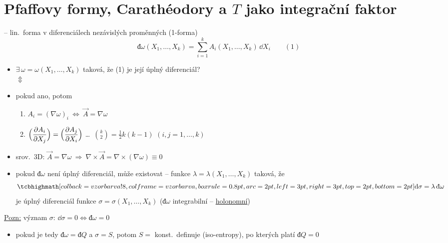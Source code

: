 \section{Pfaffovy formy, Carathéodory a $T$ jako integrační faktor}
\providecommand{\dbar}{\text{đ}}
\providecommand{\xcancel}[1]{\text{\tikz[baseline=(X.base)]{\node[inner sep=0pt] (X) {$\displaystyle #1$}; \draw[NavyBlue] (X.south west) -- (X.north east);}}}

\begin{definice}
 -- lin.\ forma v diferenciálech nezávislých proměnných (1-forma)
\[
  \dbar\omega(X_1,\dots,X_k) = \sum_{i=1}^k A_i(X_1,\dots,X_k)\,\dd X_i \qquad (1)
\]
\end{definice}
\begin{itemize}
  \item $\exists\,\omega = \omega(X_1,\dots,X_k)$ taková, že (1) je její úplný diferenciál? \\
  \quad $\Updownarrow$ \\
  \quad {}
  \item pokud ano, potom
  \begin{enumerate}[label=\alph*)]
    \item $A_i = (\nabla\omega)_i \ \Leftrightarrow\ \vec A = \nabla\omega$
    \item $\displaystyle\Big(\pdv{A_i}{X_j}\Big) = \Big(\pdv{A_j}{X_i}\Big)$ \quad \dots\ $\binom k2 = \frac12k(k-1)$  \quad $(i,j = 1,\dots,k)$
  \end{enumerate}
  \item srov.\ 3D: \quad $\vec A = \nabla\omega \ \Rightarrow\ \nabla\times\vec A = \nabla\times(\nabla\omega)\equiv 0$
  \item pokud $\dbar\omega$ není úplný diferenciál, může existovat  -- funkce $\lambda = \lambda(X_1,\dots,X_k)$ taková, že
  \[ \vzorec{\dd\sigma = \lambda\,\dbar\omega} \]
  je úplný diferenciál funkce $\sigma = \sigma(X_1,\dots,X_k)$ \quad ($\dbar\omega$ integrabilní -- \underline{holonomní})
\end{itemize}

\underline{Pozn:} význam $\sigma$: \quad $\dd\sigma = 0 \Leftrightarrow \dbar\omega = 0$
\begin{itemize}
  \item pokud je tedy $\dbar\omega = \dbar Q$ a $\sigma = S$, potom $S = $ konst.\ definuje  (iso-entropy), po kterých platí $\dbar Q = 0$
\end{itemize}


